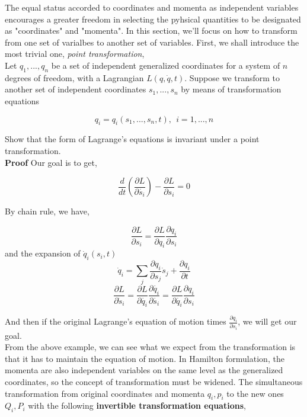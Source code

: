 \documentclass[12pt]{article}
\begin{document}
The equal status accorded to coordinates and momenta as independent variables encourages a greater freedom in selecting the pyhsical quantities to be designated as "coordinates" and "momenta". In this section, we'll focus on how to transform from one set of varialbes to another set of variables. First, we shall introduce the most trivial one, \textit{point transformation},
\\
Let $q_1, ..., q_n$ be a set of independent generalized coordinates for a system of $n$ degrees of freedom, with a Lagrangian $L(q, \dot{q}, t)$. Suppose we transform to another set of independent coordinates $s_1, ..., s_n$ by means of transformation equations

\begin{center}
    \[ q_i = q_i(s_1, ... ,s_n, t),\ \  i = 1, ... ,n \]
\end{center}

Show that the form of Lagrange's equations is invariant under a point transformation.
\\
\indent \textbf{Proof } Our goal is to get,

\begin{center}
    \[ \frac{d}{dt} \left( \frac{\partial L}{\partial \dot{s_i}} \right) - \frac{\partial L}{\partial s_i} = 0 \]
\end{center}

By chain rule, we have,

\begin{center}
    \[ \frac{\partial L}{\partial s_i} = \frac{\partial L}{\partial q_i}\frac{\partial q_i}{\partial s_i} \]
    and the expansion of $\dot{q}_i(s_i, t)$
    \[ \dot{q}_i = \sum_{j}{\frac{\partial q_i}{\partial s_j} \dot{s}_j} + \frac{\partial q_i}{\partial t} \]
    \[ \frac{\partial L}{\partial \dot{s}_i} = \frac{\partial L}{\partial \dot{q_i}} \frac{\partial \dot{q_i}}{\partial \dot{s_i}} = \frac{\partial L}{\partial \dot{q_i}} \frac{\partial q_i}{\partial s_i} \]
\end{center}

And then if the original Lagrange's equation of motion times $\frac{\partial q_i}{\partial s_i}$, we will get our goal.
\\
From the above example, we can see what we expect from the transformation is that it has to maintain the equation of motion. In Hamilton formulation, the momenta are also independent variables on the same level as the generalized coordinates, so the concept of transformation must be widened. The simultaneous transformation from original coordinates and momenta $q_i, p_i$ to the new ones $Q_i, P_i$ with the following \textbf{invertible transformation equations},
\end{document}
